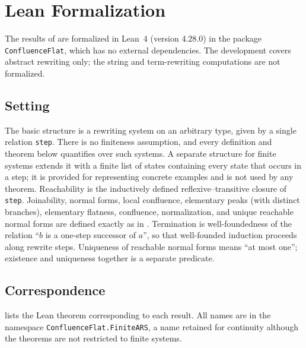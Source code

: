 \section{Lean Formalization}
\label{app:lean-formal-core}

The results of  are formalized in Lean~4 (version 4.28.0) in the package \texttt{ConfluenceFlat}, which has no external dependencies. The development covers abstract rewriting only; the string and term-rewriting computations are not formalized.

\subsection{Setting}

The basic structure is a rewriting system on an arbitrary type, given by a single relation \texttt{step}. There is no finiteness assumption, and every definition and theorem below quantifies over such systems. A separate structure for finite systems extends it with a finite list of states containing every state that occurs in a step; it is provided for representing concrete examples and is not used by any theorem. Reachability is the inductively defined reflexive--transitive closure of \texttt{step}. Joinability, normal forms, local confluence, elementary peaks (with distinct branches), elementary flatness, confluence, normalization, and unique reachable normal forms are defined exactly as in . Termination is well-foundedness of the relation ``$b$ is a one-step successor of $a$'', so that well-founded induction proceeds along rewrite steps. Uniqueness of reachable normal forms means ``at most one''; existence and uniqueness together is a separate predicate.

\subsection{Correspondence}

 lists the Lean theorem corresponding to each result. All names are in the namespace \texttt{ConfluenceFlat.FiniteARS}, a name retained for continuity although the theorems are not restricted to finite systems.

